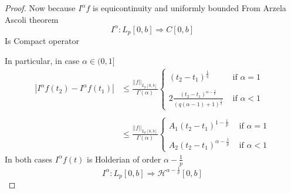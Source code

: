 \begin{proof}[Proof]
    Now because $I^\alpha f$ is equicontinuity and uniformly bounded From Arzela Ascoli theorem
    \[
    I^{\alpha} : L_p[0,b] \Longrightarrow  C[0,b]
    \]
    Is Compact operator 

    In particular, in case $\alpha \in (0,1]$
    \begin{align*}
        |I^\alpha f(t_2)-I^\alpha f(t_1)| &\leq \frac{||f||_{L_p[0,b]}}{\Gamma(\alpha)}
        \begin{cases}
            \displaystyle \left(t_2 - t_1\right)^{\frac{1}{q}} & \text{ if } \alpha =1
            \\\\
            \displaystyle 2\frac{(t_2-t_1)^{\alpha-\frac{1}{p}}}{\left(q(\alpha-1)+1\right)^{\frac{1}{q}}}
            & \text{ if } \alpha <1
        \end{cases}
        \\\\
        &\leq \frac{||f||_{L_p[0,b]}}{\Gamma(\alpha)}
        \begin{cases}
            \displaystyle A_1 (t_2 - t_1)^{1-\frac{1}{p}} & \text{ if } \alpha =1
            \\\\
            \displaystyle A_2 (t_2-t_1)^{\alpha-\frac{1}{p}}
            & \text{ if } \alpha <1
        \end{cases}
    \end{align*}
    In both cases $I^\alpha f(t)$ is Holderian of order $\alpha-\frac{1}{p}$
    \[
    I^{\alpha} : L_p[0,b] \Longrightarrow  \mathcal{H}^{\alpha-\frac{1}{p}}[0,b]
    \]
\end{proof}
